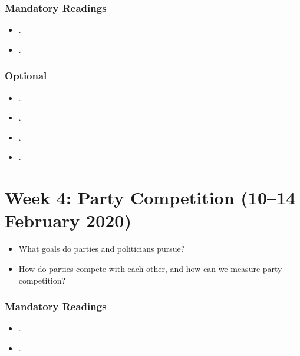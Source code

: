 \documentclass[abstract=on,parskip=full,headings=standardclasses,fontsize=11pt,paper=a4]{scrartcl}
\begin{document}
\subsubsection*{Mandatory Readings}

\begin{itemize}
\item {}.
\item {}.
\end{itemize}



\subsubsection*{Optional}
\begin{itemize}
\item {}.
\item {}.
\item {}.
\item {}.
\end{itemize}







\section{Week 4:  Party Competition (10--14 February 2020)}

\begin{itemize}
\renewcommand\labelitemi{--}
\item What goals do parties and politicians pursue?
\item How do parties compete with each other, and how can we measure party competition?
\end{itemize}

\subsubsection*{Mandatory Readings}
\begin{itemize}
\item {}.
\item {}.
\end{itemize}
\end{document}
